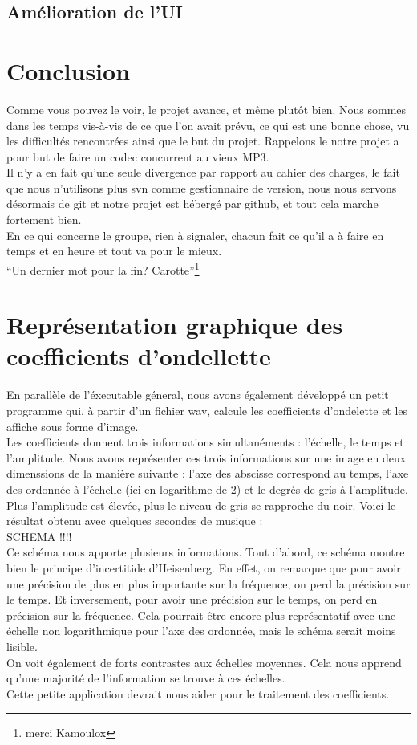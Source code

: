 \documentclass[a4paper,12pt]{article}
\begin{document}
	\subsection{Amélioration de l'UI}

\newpage

\section*{Conclusion}
Comme vous pouvez le voir, le projet avance, et même plutôt bien. Nous sommes
dans les temps vis-à-vis de ce que l'on avait prévu, ce qui est une bonne chose,
vu les difficultés rencontrées ainsi que le but du projet. Rappelons le notre
projet a pour but de faire un codec concurrent au vieux MP3.\\
Il n'y a en fait qu'une seule divergence par rapport au cahier des charges, le
fait que nous n'utilisons plus svn comme gestionnaire de version, nous nous
servons désormais de git et notre projet est hébergé par github, et tout cela
marche fortement bien.\\
En ce qui concerne le groupe, rien à signaler, chacun fait ce qu'il a à faire en
temps et en heure et tout va pour le mieux.\\
``Un dernier mot pour la fin? Carotte''\footnote{merci Kamoulox}\\

\newpage
\appendix
\section{Représentation graphique des coefficients d'ondellette}
En parallèle de l'éxecutable géneral, nous avons également développé
un petit programme qui, à partir d'un fichier wav, calcule les
coefficients d'ondelette et les affiche sous forme d'image.\\
Les coefficients donnent trois informations simultanéments :
l'échelle, le temps et l'amplitude. Nous avons représenter ces trois
informations sur une image en deux dimenssions de la manière suivante
: l'axe des abscisse correspond au temps, l'axe des ordonnée à
l'échelle (ici en logarithme de 2) et le degrés de gris à l'amplitude. Plus
l'amplitude est élevée, plus le niveau de gris se rapproche du noir.
Voici le résultat obtenu avec quelques secondes de musique :\\
SCHEMA !!!!
\\
Ce schéma nous apporte plusieurs informations. Tout d'abord, ce schéma
montre bien le principe d'incertitide d'Heisenberg. En effet, on
remarque que pour avoir une précision de plus en plus importante sur
la fréquence, on perd la précision sur le temps. Et inversement, pour
avoir une précision sur le temps, on perd en précision sur la
fréquence. Cela pourrait être encore plus représentatif avec une
échelle non logarithmique pour l'axe des ordonnée, mais le schéma
serait moins lisible.\\
On voit également de forts contrastes aux échelles moyennes. Cela nous
apprend qu'une majorité de l'information se trouve à ces échelles.
\\
Cette petite application devrait nous aider pour le traitement des
coefficients.
\end{document}
